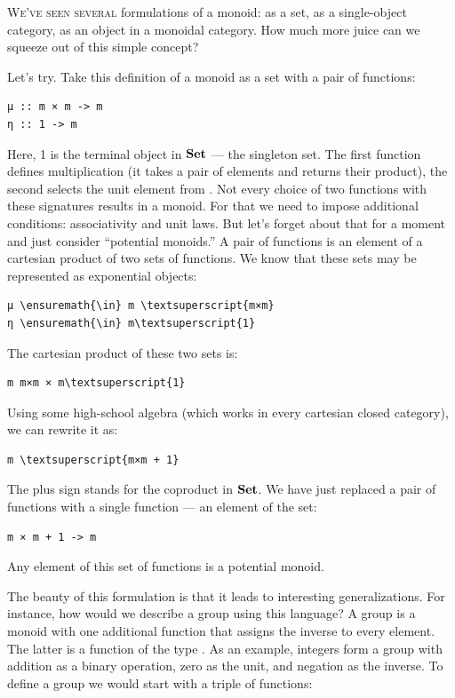 \lettrine[lhang=0.17]{W}{e've seen several} formulations of a monoid: as a set, as a
single-object category, as an object in a monoidal category. How much
more juice can we squeeze out of this simple concept?

Let's try. Take this definition of a monoid as a set  with a
pair of functions:

\begin{Verbatim}[commandchars=\\\{\}]
μ :: m × m -> m
η :: 1 -> m
\end{Verbatim}
Here, 1 is the terminal object in $\mathbf{Set}$ --- the singleton set.
The first function defines multiplication (it takes a pair of elements
and returns their product), the second selects the unit element from
. Not every choice of two functions with these signatures
results in a monoid. For that we need to impose additional conditions:
associativity and unit laws. But let's forget about that for a moment
and just consider ``potential monoids.'' A pair of functions is an
element of a cartesian product of two sets of functions. We know that
these sets may be represented as exponential objects:

\begin{Verbatim}[commandchars=\\\{\}]
μ \ensuremath{\in} m \textsuperscript{m×m}
η \ensuremath{\in} m\textsuperscript{1}
\end{Verbatim}
The cartesian product of these two sets is:

\begin{Verbatim}[commandchars=\\\{\}]
m m×m × m\textsuperscript{1}
\end{Verbatim}
Using some high-school algebra (which works in every cartesian closed
category), we can rewrite it as:

\begin{Verbatim}[commandchars=\\\{\}]
m \textsuperscript{m×m + 1}
\end{Verbatim}
The plus sign stands for the coproduct in $\mathbf{Set}$. We have just
replaced a pair of functions with a single function --- an element of
the set:

\begin{Verbatim}[commandchars=\\\{\}]
m × m + 1 -> m
\end{Verbatim}
Any element of this set of functions is a potential monoid.

The beauty of this formulation is that it leads to interesting
generalizations. For instance, how would we describe a group using this
language? A group is a monoid with one additional function that assigns
the inverse to every element. The latter is a function of the type
. As an example, integers form a group with
addition as a binary operation, zero as the unit, and negation as the
inverse. To define a group we would start with a triple of functions:

